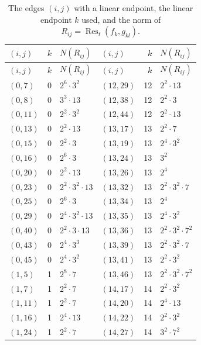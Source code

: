 \documentclass[11pt]{article}
\begin{document}
\begingroup\small
\setlength{\LTcapwidth}{\textwidth}
\begin{longtable}{@{}lrl@{\qquad}lrl@{}}
\caption{The edges $(i,j)$ with a linear endpoint, the linear endpoint $k$ used, and the norm of $R_{ij}=\operatorname{Res}_t(f_k,g_{kl})$.}\label{tab:sep}\\
\hline $(i,j)$ & $k$ & $N(R_{ij})$ & $(i,j)$ & $k$ & $N(R_{ij})$\\\hline\endfirsthead\hline $(i,j)$ & $k$ & $N(R_{ij})$ & $(i,j)$ & $k$ & $N(R_{ij})$\\\hline\endhead\hline\endfoot
$(0,7)$ & 0 & $2^{6}\cdot 3^{2}$ & $(12,29)$ & 12 & $2^{2}\cdot 13$\\
$(0,8)$ & 0 & $3^{3}\cdot 13$ & $(12,38)$ & 12 & $2^{2}\cdot 3$\\
$(0,11)$ & 0 & $2^{2}\cdot 3^{2}$ & $(12,44)$ & 12 & $2^{2}\cdot 13$\\
$(0,13)$ & 0 & $2^{2}\cdot 13$ & $(13,17)$ & 13 & $2^{2}\cdot 7$\\
$(0,15)$ & 0 & $2^{2}\cdot 3$ & $(13,19)$ & 13 & $2^{4}\cdot 3^{2}$\\
$(0,16)$ & 0 & $2^{6}\cdot 3$ & $(13,24)$ & 13 & $3^{2}$\\
$(0,20)$ & 0 & $2^{2}\cdot 13$ & $(13,26)$ & 13 & $2^{4}$\\
$(0,23)$ & 0 & $2^{2}\cdot 3^{2}\cdot 13$ & $(13,32)$ & 13 & $2^{2}\cdot 3^{2}\cdot 7$\\
$(0,25)$ & 0 & $2^{6}\cdot 3$ & $(13,34)$ & 13 & $2^{4}$\\
$(0,29)$ & 0 & $2^{4}\cdot 3^{2}\cdot 13$ & $(13,35)$ & 13 & $2^{4}\cdot 3^{2}$\\
$(0,40)$ & 0 & $2^{2}\cdot 3\cdot 13$ & $(13,36)$ & 13 & $2^{2}\cdot 3^{2}\cdot 7^{2}$\\
$(0,43)$ & 0 & $2^{4}\cdot 3^{3}$ & $(13,39)$ & 13 & $2^{2}\cdot 3^{2}\cdot 7$\\
$(0,45)$ & 0 & $2^{4}\cdot 3^{2}$ & $(13,41)$ & 13 & $2^{2}\cdot 3^{2}$\\
$(1,5)$ & 1 & $2^{8}\cdot 7$ & $(13,46)$ & 13 & $2^{2}\cdot 3^{2}\cdot 7^{2}$\\
$(1,7)$ & 1 & $2^{2}\cdot 7$ & $(14,17)$ & 14 & $2^{2}\cdot 3^{2}$\\
$(1,11)$ & 1 & $2^{2}\cdot 7$ & $(14,20)$ & 14 & $2^{4}\cdot 13$\\
$(1,16)$ & 1 & $2^{4}\cdot 13$ & $(14,22)$ & 14 & $2^{2}\cdot 3^{2}$\\
$(1,24)$ & 1 & $2^{2}\cdot 7$ & $(14,27)$ & 14 & $3^{2}\cdot 7^{2}$\\

\end{longtable}
\end{document}
